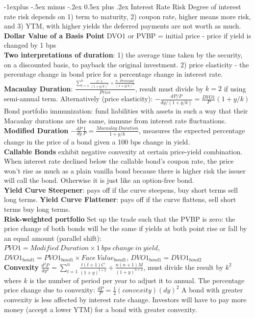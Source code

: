 \documentclass[10pt,landscape]{article}
\makeatletter
\renewcommand{\subsection}{\@startsection{subsection}{2}{0mm}%
                                {-1explus -.5ex minus -.2ex}%
                                {0.5ex plus .2ex}%
                                {\normalfont\normalsize\bfseries}}
\makeatother
\begin{document}
\begin{multicols}{3}
\subsection{Interest Rate Risk}
Degree of interest rate risk depends on 1) term to maturity, 2) coupon rate, higher means more risk, and 3) YTM, with higher yields the deferred payments are not worth as much.\\
{\bf Dollar Value of a Basis Point} DVO1 or PVBP = initial price - price if yield is changed by 1 bps\\
{\bf Two interpretations of duration}: 1) the average time taken by the security, on a discounted basis, to payback the original investment. 2) price elasticity - the percentage change in bond price for a percentage change in interest rate.\\
{\bf Macaulay Duration}: $\frac{\sum_{t=1}^{n} \frac{C \cdot t}{(1+y/k)^t} + \frac{n \cdot Principal}{(1+y/k)^n}}{Price}$, result must divide by $k=2$ if using semi-annual term. Alternatively (price elasticity): $-\frac{dP/P}{dy/(1+y/k)} = \frac{DVO1}{P}(1+y/k)$\\
Bond portfolio immunization: fund liabilities with assets in such a way that their Macaulay durations are the same, immune from interest rate fluctuations.\\
{\bf Modified Duration} $- \frac{dP}{dy}\frac{1}{P} = \frac {Macaulay \ Duration}{1+y/k}$, measures the expected percentage change in the price of a bond given a 100 bps change in yield.\\
{\bf Callable Bonds} exhibit negative convexity at certain price-yield combination. When interest rate declined below the callable bond's coupon rate, the price won't rise as much as a plain vanilla bond because there is higher risk the issuer will call the bond. Otherwise it is just like an option-free bond.\\
{\bf Yield Curve Steepener}: pays off if the curve steepens, buy short terms sell long terms. {\bf Yield Curve Flattener}: pays off if the curve flattens, sell short terms buy long terms.\\
{\bf Risk-weighted portfolio} Set up the trade such that the PVBP is zero: the price change of both bonds will be the same if yields at both point rise or fall by an equal amount (parallel shift): $PVO1 = Modified \ Duration \times 1\ bps\ change\ in\ yield$, ${DVO1}_{bond 1} = {PVO1}_{bond 1} \times {Face\ Value}_{bond 1}$, ${DVO1}_{bond 1} = {DVO1}_{bond 2}$\\
{\bf Convexity} $\frac{d^2P}{dy^2} = \sum_{t=1}^{n} {\frac {t (t+1) C}{{(1+y)}^{t+2}}} + \frac{n(n+1)M}{(1+y)^{n+2}}$, must divide the result by $k^2$ where $k$ is the number of period per year to adjust it to annual. The percentage price change due to convexity: $\frac{dP}{P} = \frac{1}{2}(convexity)(dy)^2$ A bond with greater convexity is less affected by interest rate change. Investors will have to pay more money (accept a lower YTM) for a bond with greater convexity.\\

\end{multicols}
\end{document}

